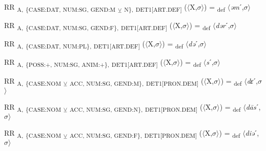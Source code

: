 {\begin{exe}
 RR \textsubscript{A,} \textsubscript{\{CASE:DAT, NUM:SG, GEND:M} \textsubscript{${\veebar}$}\textsubscript{ N\},} \textsubscript{DET1[ART.DEF]} ($\langle$X,$\sigma $$\rangle$) = \textsubscript{def} $\langle$\textit{əm}ˊ,$\sigma $$\rangle$
\end{exe}

\begin{exe}
 RR \textsubscript{A,} \textsubscript{\{CASE:DAT, NUM:SG, GEND:F\},} \textsubscript{DET1[ART.DEF]} ($\langle$X,$\sigma $$\rangle$) = \textsubscript{def} $\langle$\textit{dər}ˊ,$\sigma $$\rangle$
\end{exe}

\begin{exe}
 RR \textsubscript{A,} \textsubscript{\{CASE:DAT, NUM:PL\},} \textsubscript{DET1[ART.DEF]} ($\langle$X,$\sigma $$\rangle$) = \textsubscript{def} $\langle$\textit{də}ˊ,$\sigma $$\rangle$
\end{exe}

\begin{exe}
 RR \textsubscript{A,} \textsubscript{\{POSS:+, NUM:SG, ANIM:+\},} \textsubscript{DET1[ART.DEF]} ($\langle$X,$\sigma $$\rangle$) = \textsubscript{def} $\langle$\textit{s}ˊ,$\sigma $$\rangle$
\end{exe}

\begin{exe}
 RR \textsubscript{A,} \textsubscript{\{CASE:NOM} \textsubscript{${\veebar}$}\textsubscript{ ACC, NUM:SG, GEND:M\},} \textsubscript{DET1[PRON.DEM]} ($\langle$X,$\sigma $$\rangle$) = \textsubscript{def} $\langle$\textit{dɛ}ˊ,$\sigma $$\rangle$
\end{exe}

\begin{exe}
 RR \textsubscript{A,} \textsubscript{\{CASE:NOM} \textsubscript{${\veebar}$}\textsubscript{ ACC, NUM:SG, GEND:N\},} \textsubscript{DET1[PRON.DEM]} ($\langle$X,$\sigma $$\rangle$) = \textsubscript{def} $\langle$\textit{d\=as}ˊ,$\sigma $$\rangle$
\end{exe}

\begin{exe}
 RR \textsubscript{A,} \textsubscript{\{CASE:NOM} \textsubscript{${\veebar}$}\textsubscript{ ACC, NUM:SG, GEND:F\},} \textsubscript{DET1[PRON.DEM]} ($\langle$X,$\sigma $$\rangle$) = \textsubscript{def} $\langle$\textit{diə}ˊ,$\sigma $$\rangle$
\end{exe}

}
